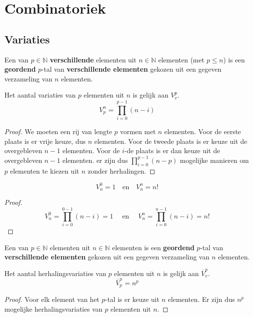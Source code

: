 \documentclass[main.tex]{subfiles}
\begin{document}
\chapter{Combinatoriek}
\label{cha:combinatoriek}


\section{Variaties}
\label{sec:variaties}

\begin{de}
  Een  van $p\in \mathbb{N}$ \textbf{verschillende} elementen uit $n\in \mathbb{N}$ elementen (met $p \le n$) is een \textbf{geordend} $p$-tal van \textbf{verschillende elementen} gekozen uit een gegeven verzameling van $n$ elementen.    
\end{de}

\begin{st}
  Het aantal variaties van $p$ elementen uit $n$ is gelijk aan $V_{v}^{p}$.
  \[
  V_{p}^{n} = \prod_{i=0}^{p-1}(n-i)
  \]

  \begin{proof}
    We moeten een rij van lengte $p$ vormen met $n$ elementen.
    Voor de eerste plaats is er vrije keuze, dus $n$ elementen.
    Voor de tweede plaats is er keuze uit de overgebleven $n-1$ elementen.
    Voor de $i$-de plaats is er dan keuze uit de overgebleven $n-1$ elementen.
    er zijn dus $\prod_{i=0}^{p-1}(n-p)$ mogelijke manieren om $p$ elementen te kiezen uit $n$ zonder herhalingen.
  \end{proof}
\end{st}

\begin{ei}
  \[ V_{n}^{0} = 1 \quad\text{en}\quad V_{n}^{n} = n! \]

  \begin{proof}
    \[ V_{n}^{0} = \prod_{i=0}^{0-1}(n-i) = 1 \quad\text{ en }\quad V_{n}^{n} = \prod_{i=0}^{n-1}(n-i) = n!\]
  \end{proof}
\end{ei}

\begin{de}
  Een  van $p\in \mathbb{N}$ elementen uit $n\in \mathbb{N}$ elementen is een \textbf{geordend} $p$-tal van \textbf{verschillende elementen} gekozen uit een gegeven verzameling van $n$ elementen.  
\end{de}

\begin{st}
  Het aantal herhalingsvariaties van $p$ elementen uit $n$ is gelijk aan $\overline{V}_{v}^{p}$.
  \[
  \overline{V}_{p}^{n} = n^{p}
  \]

  \begin{proof}
    Voor elk element van het $p$-tal is er keuze uit $n$ elementen. 
    Er zijn dus $n^{p}$ mogelijke herhalingsvariaties van $p$ elementen uit $n$.
  \end{proof}
\end{st}
\end{document}
